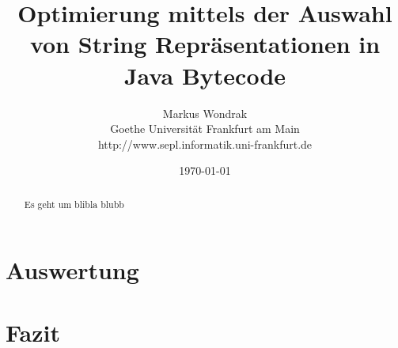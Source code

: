 \documentclass[12pt]{report}
\title{Optimierung mittels der Auswahl von String Repräsentationen in Java Bytecode}
\author{Markus Wondrak\\Goethe Universität Frankfurt am Main\\http://www.sepl.informatik.uni-frankfurt.de}
\date{\today}
\begin{document}
\maketitle
{}
\tableofcontents
\listoffigures
\listofalgorithms

\begin{abstract}
Es geht um blibla blubb
\end{abstract}







\chapter{Auswertung}

\chapter{Fazit}
\end{document}
